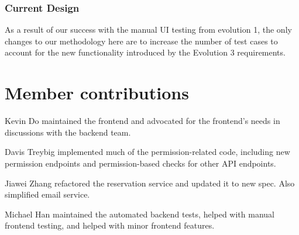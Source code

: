 \documentclass[12pt]{article}
\begin{document}
\subsubsection{Current Design}
As a result of our success with the manual UI testing from evolution 1, the only changes to our methodology here are to increase the number of test cases to account for the new functionality introduced by the Evolution 3 requirements.

\section{Member contributions}

Kevin Do maintained the frontend and advocated for the frontend's needs in discussions with the backend team.

Davis Treybig implemented much of the permission-related code, including new permission endpoints and permission-based checks for other API endpoints. 

Jiawei Zhang refactored the reservation service and updated it to new spec. Also simplified email service.

Michael Han maintained the automated backend tests, helped with manual frontend testing, and helped with minor frontend features.

\clearpage
\appendix
\end{document}
